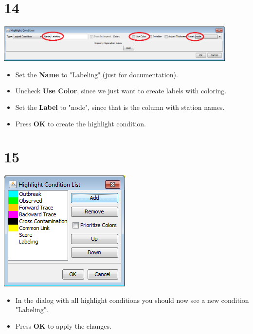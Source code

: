 \documentclass{beamer}
\begin{document}
\section{14}
\begin{frame}
	\begin{center}
  		\includegraphics[width=0.9\textwidth]{14.png}
	\end{center}
	\begin{itemize}
		\item Set the \textbf{Name} to "Labeling" (just for documentation).
		\item Uncheck \textbf{Use Color}, since we just want to create labels with coloring.
		\item Set the \textbf{Label} to "node", since that is the column with station names.
		\item Press \textbf{OK} to create the highlight condition.
	\end{itemize}
\end{frame}

\section{15}
\begin{frame}
	\begin{center}
  		\includegraphics[height=0.6\textheight]{15.png}
	\end{center}
	\begin{itemize}
		\item In the dialog with all highlight conditions you should now see a new condition "Labeling".
		\item Press \textbf{OK} to apply the changes.
	\end{itemize}
\end{frame}
\end{document}
